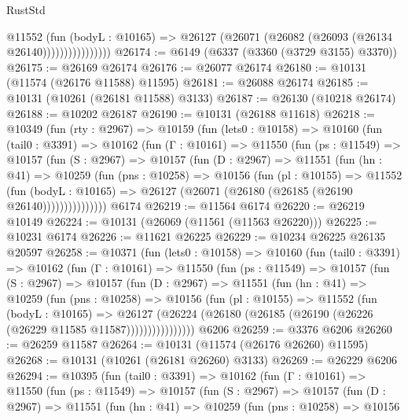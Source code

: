 \begin{lexlean}{RustStd}
\begin{coremodule}
                        @11552
                          (fun (bodyL : @10165) =>
                          @26127 (@26071 (@26082 (@26093 (@26134 @26140))))))))))))))))
@26174 := @6149 (@6337 (@3360 (@3729 @3155) @3370))
@26175 := @26169 @26174
@26176 := @26077 @26174
@26180 := @10131 (@11574 (@26176 @11588) @11595)
@26181 := @26088 @26174
@26185 := @10131 (@10261 (@26181 @11588) @3133)
@26187 := @26130 (@10218 @26174)
@26188 := @10202 @26187
@26190 := @10131 (@26188 @11618)
@26218 := @10349
    (fun (rty : @2967) =>
    @10159
      (fun (lets0 : @10158) =>
      @10160
        (fun (tail0 : @3391) =>
        @10162
          (fun (Γ : @10161) =>
          @11550
            (fun (ps : @11549) =>
            @10157
              (fun (S : @2967) =>
              @10157
                (fun (D : @2967) =>
                @11551
                  (fun (hn : @41) =>
                  @10259
                    (fun (pns : @10258) =>
                    @10156
                      (fun (pl : @10155) =>
                      @11552
                        (fun (bodyL : @10165) =>
                        @26127 (@26071 (@26180 (@26185 (@26190 @26140)))))))))))))))
    @6174
@26219 := @11564 @6174
@26220 := @26219 @10149
@26224 := @10131 (@26069 (@11561 (@11563 @26220)))
@26225 := @10231 @6174
@26226 := @11621 @26225
@26229 := @10234 @26225 @26135 @20597
@26258 := @10371
    (fun (lets0 : @10158) =>
    @10160
      (fun (tail0 : @3391) =>
      @10162
        (fun (Γ : @10161) =>
        @11550
          (fun (ps : @11549) =>
          @10157
            (fun (S : @2967) =>
            @10157
              (fun (D : @2967) =>
              @11551
                (fun (hn : @41) =>
                @10259
                  (fun (pns : @10258) =>
                  @10156
                    (fun (pl : @10155) =>
                    @11552
                      (fun (bodyL : @10165) =>
                      @26127
                        (@26224
                          (@26180 (@26185 (@26190 (@26226 (@26229 @11585 @11587))))))))))))))))
    @6206
@26259 := @3376 @6206
@26260 := @26259 @11587
@26264 := @10131 (@11574 (@26176 @26260) @11595)
@26268 := @10131 (@10261 (@26181 @26260) @3133)
@26269 := @26229 @6206
@26294 := @10395
    (fun (tail0 : @3391) =>
    @10162
      (fun (Γ : @10161) =>
      @11550
        (fun (ps : @11549) =>
        @10157
          (fun (S : @2967) =>
          @10157
            (fun (D : @2967) =>
            @11551
              (fun (hn : @41) =>
              @10259
                (fun (pns : @10258) =>
                @10156

\end{coremodule}
\end{lexlean}
